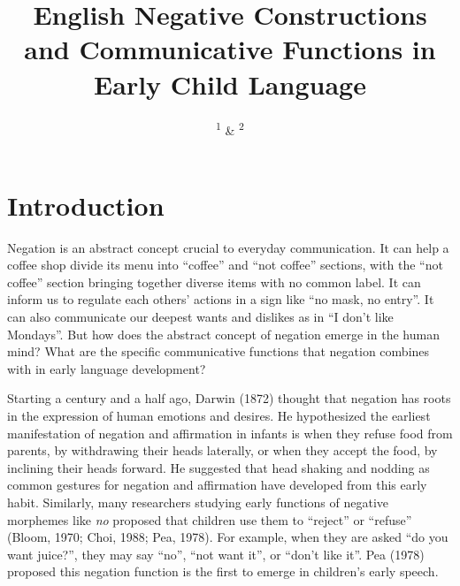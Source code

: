 \documentclass[
  english,
  man,floatsintext]{apa6}
\title{English Negative Constructions and Communicative Functions in Early Child Language}
\author{\textsuperscript{1} \& \textsuperscript{2}}
\date{}
\affiliation{\vspace{0.5cm}\textsuperscript{1} \\\textsuperscript{2} }
\begin{document}
\maketitle

\hypertarget{introduction}{%
\section{Introduction}\label{introduction}}

Negation is an abstract concept crucial to everyday communication. It can help a coffee shop divide its menu into \enquote{coffee} and \enquote{not coffee} sections, with the \enquote{not coffee} section bringing together diverse items with no common label. It can inform us to regulate each others' actions in a sign like \enquote{no mask, no entry}. It can also communicate our deepest wants and dislikes as in \enquote{I don't like Mondays}. But how does the abstract concept of negation emerge in the human mind? What are the specific communicative functions that negation combines with in early language development?

Starting a century and a half ago, Darwin (1872) thought that negation has roots in the expression of human emotions and desires. He hypothesized the earliest manifestation of negation and affirmation in infants is when they refuse food from parents, by withdrawing their heads laterally, or when they accept the food, by inclining their heads forward. He suggested that head shaking and nodding as common gestures for negation and affirmation have developed from this early habit. Similarly, many researchers studying early functions of negative morphemes like \emph{no} proposed that children use them to \enquote{reject} or \enquote{refuse} (Bloom, 1970; Choi, 1988; Pea, 1978). For example, when they are asked \enquote{do you want juice?}, they may say \enquote{no}, \enquote{not want it}, or \enquote{don't like it}. Pea (1978) proposed this negation function is the first to emerge in children's early speech.
\end{document}
